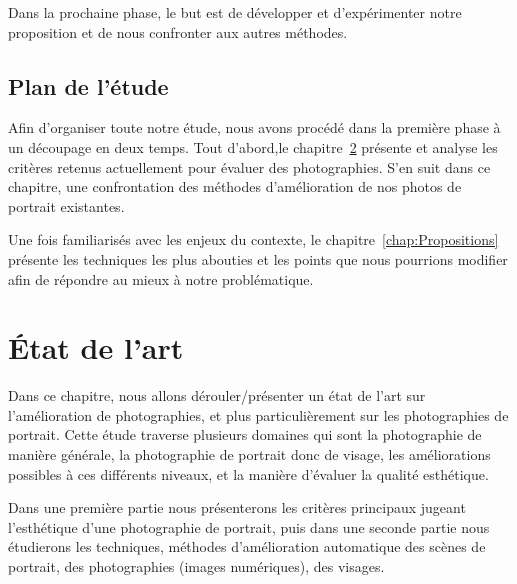 \documentclass[11pt, french]{report-rd-info}
\begin{document}
Dans la prochaine phase, le but est de développer et d'expérimenter notre proposition et de nous confronter aux autres méthodes.


\section{Plan de l'étude}
Afin d'organiser toute notre étude, nous avons procédé dans la première phase à un découpage en deux temps. Tout d'abord,le chapitre~\ref{chap:EtatArt} présente et analyse les critères retenus actuellement pour évaluer des photographies. S'en suit dans ce chapitre, une confrontation des méthodes d'amélioration de nos photos de portrait existantes. 

Une fois familiarisés avec les enjeux du contexte, le chapitre~\ref{chap:Propositions} présente les techniques les plus abouties et les points que nous pourrions modifier afin de répondre au mieux à notre problématique. 



\chapter{\'Etat de l'art}
\label{chap:EtatArt}
Dans ce chapitre, nous allons dérouler/présenter un état de l’art sur l’amélioration de photographies, et plus particulièrement sur les photographies de portrait. Cette étude traverse plusieurs domaines qui sont la photographie de manière générale, la photographie de portrait donc de visage, les améliorations possibles à ces différents niveaux, et la manière d’évaluer la qualité esthétique.


Dans une première partie nous présenterons les critères principaux jugeant l’esthétique d’une photographie de portrait, puis dans une seconde partie nous étudierons les techniques, méthodes d’amélioration automatique des scènes de portrait, des photographies (images numériques), des visages.
\end{document}
